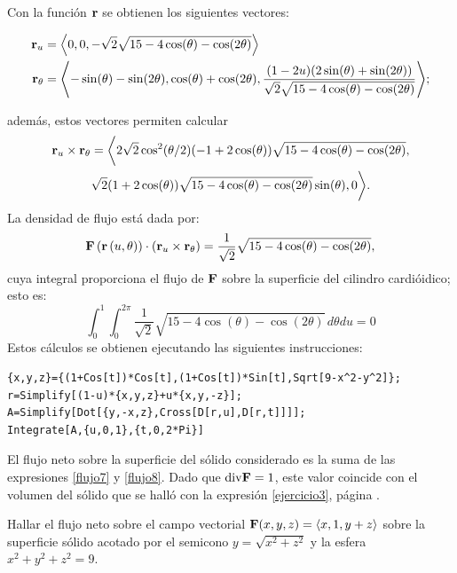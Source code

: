 \begin{parrafonumerado}
Con la función ${\bf r}$ se obtienen los siguientes vectores:
\begin{small}
\begin{align*}
{\bf r}_{u} &= \left \langle 0,0,-\sqrt{2}\sqrt{15-4\cos(\theta)-\cos(2\theta)}\right\rangle \\
{\bf r}_{\theta} &= \left\langle -\sin(\theta)-\sin(2\theta),\cos(\theta)+\cos(2\theta),\frac{(1-2u)(2\sin(\theta)+\sin(2\theta))}{\sqrt{2}\sqrt{15-4\cos(\theta)-\cos(2\theta)}} \right\rangle\!;
\end{align*}
\end{small}
además, estos vectores permiten calcular
\begin{multline*}
{\bf r}_{u}\times {\bf r}_{\theta } = \bigg\langle 2\sqrt{2}\cos^2(\theta/2)(-1+2\cos(\theta))\sqrt{15-4\cos(\theta)-\cos(2\theta)}, \\
\sqrt{2}(1+2\cos(\theta))\sqrt{15-4\cos(\theta)-\cos(2\theta)}\sin(\theta),0 \bigg\rangle .
\end{multline*}
La densidad de flujo está dada por:
\[{\bf F}\left({\bf r}\left( u,\theta \right) \right) \cdot \left({\bf r}_{u}\times {\bf r}_{\theta}\right) =\frac{1}{\sqrt{2}}\sqrt{15 - 4 \cos(\theta) - \cos(2\theta)},\]
cuya integral proporciona el flujo de ${\bf F}$ sobre la superficie del cilindro cardióidico; esto es:
\begin{equation}\label{flujo8}
\int_{0}^{1}\int_{0}^{2\pi} \frac{1}{\sqrt{2}}\sqrt{15 - 4 \cos(\theta) - \cos(2\theta)}\,
d\theta du=0
\end{equation}
Estos cálculos se obtienen ejecutando las siguientes instrucciones:

\begin{tcolorbox}[title=\bf Instrucción \verb"Mathematica"]\begin{Verbatim}[formatcom=\letraverbatim]
{x,y,z}={(1+Cos[t])*Cos[t],(1+Cos[t])*Sin[t],Sqrt[9-x^2-y^2]};
r=Simplify[(1-u)*{x,y,z}+u*{x,y,-z}];
A=Simplify[Dot[{y,-x,z},Cross[D[r,u],D[r,t]]]];
Integrate[A,{u,0,1},{t,0,2*Pi}]
\end{Verbatim}
\end{tcolorbox}

El flujo neto sobre la superficie del sólido considerado es la suma de las expresiones \ref{flujo7}
y \ref{flujo8}.
Dado que ${\rm div} {\bf F}=1$, este valor coincide con el volumen del sólido que se halló con la expresión \ref{ejercicio3}, página \pageref{ejercicio3}.

\item Hallar el flujo neto sobre el campo vectorial ${\bf F}(x,y,z) = \langle x,1,y+z \rangle $
sobre la superficie sólido acotado por el semicono $y=\sqrt{x^2+z^2}$ y la esfera $x^2+y^2+z^2=9$.


\end{parrafonumerado}
